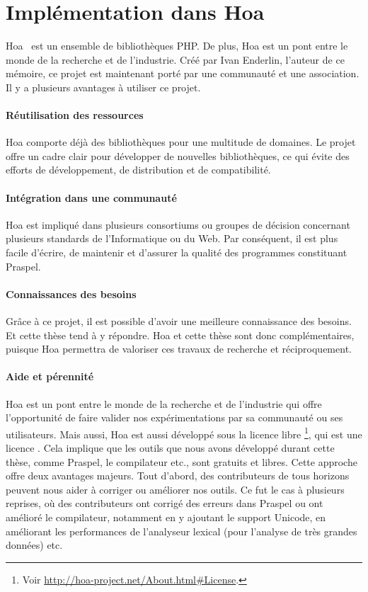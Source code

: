 \section{Implémentation dans Hoa}
\label{section:tools:hoa}

Hoa~ est un ensemble de bibliothèques PHP. De plus, Hoa est un pont
entre le monde de la recherche et de l'industrie. Créé par Ivan Enderlin,
l'auteur de ce mémoire, ce projet est maintenant porté par une communauté et une
association. Il y a plusieurs avantages à utiliser ce projet.

\paragraph{Réutilisation des ressources} Hoa comporte déjà des bibliothèques
pour une multitude de domaines. Le projet offre un cadre clair pour développer
de nouvelles bibliothèques, ce qui évite des efforts de développement, de
distribution et de compatibilité.

\paragraph{Intégration dans une communauté} Hoa est impliqué dans plusieurs
consortiums ou groupes de décision concernant plusieurs standards de
l'Informatique ou du Web. Par conséquent, il est plus facile d'écrire, de
maintenir et d'assurer la qualité des programmes constituant Praspel.

\paragraph{Connaissances des besoins} Grâce à ce projet, il est possible d'avoir
une meilleure connaissance des besoins. Et cette thèse tend à y répondre. Hoa et
cette thèse sont donc complémentaires, puisque Hoa permettra de valoriser ces
travaux de recherche et réciproquement.

\paragraph{Aide et pérennité} Hoa est un pont entre le monde de la recherche et
de l'industrie qui offre l'opportunité de faire valider nos expérimentations par
sa communauté ou ses utilisateurs. Mais aussi, Hoa est aussi développé sous la
licence libre \footnote{Voir
\url{http://hoa-project.net/About.html\#License}.}, qui est une licence
. Cela implique que les outils que nous avons développé
durant cette thèse, comme Praspel, le compilateur etc., sont gratuits et libres.
Cette approche offre deux avantages majeurs. Tout d'abord, des contributeurs de
tous horizons peuvent nous aider à corriger ou améliorer nos outils. Ce fut le
cas à plusieurs reprises, où des contributeurs ont corrigé des erreurs dans
Praspel ou ont amélioré le compilateur, notamment en y ajoutant le support
Unicode, en améliorant les performances de l'analyseur lexical (pour l'analyse
de très grandes données) etc.

